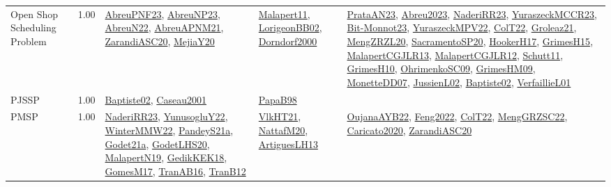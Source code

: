 {\begin{longtable}{p{3cm}r>{\raggedright\arraybackslash}p{6cm}>{\raggedright\arraybackslash}p{6cm}>{\raggedright\arraybackslash}p{8cm}}
\index{Open Shop Scheduling Problem}\index{Classification!Open Shop Scheduling Problem}Open Shop Scheduling Problem &  1.00 & \hyperref[detail:AbreuPNF23]{AbreuPNF23}, \hyperref[detail:AbreuNP23]{AbreuNP23}, \hyperref[detail:AbreuN22]{AbreuN22}, \hyperref[detail:AbreuAPNM21]{AbreuAPNM21}, \hyperref[detail:ZarandiASC20]{ZarandiASC20}, \hyperref[detail:MejiaY20]{MejiaY20} & \hyperref[detail:Malapert11]{Malapert11}, \hyperref[detail:LorigeonBB02]{LorigeonBB02}, \hyperref[detail:Dorndorf2000]{Dorndorf2000} & \hyperref[detail:PrataAN23]{PrataAN23}, \hyperref[detail:Abreu2023]{Abreu2023}, \hyperref[detail:NaderiRR23]{NaderiRR23}, \hyperref[detail:YuraszeckMCCR23]{YuraszeckMCCR23}, \hyperref[detail:Bit-Monnot23]{Bit-Monnot23}, \hyperref[detail:YuraszeckMPV22]{YuraszeckMPV22}, \hyperref[detail:ColT22]{ColT22}, \hyperref[detail:Groleaz21]{Groleaz21}, \hyperref[detail:MengZRZL20]{MengZRZL20}, \hyperref[detail:SacramentoSP20]{SacramentoSP20}, \hyperref[detail:HookerH17]{HookerH17}, \hyperref[detail:GrimesH15]{GrimesH15}, \hyperref[detail:MalapertCGJLR13]{MalapertCGJLR13}, \hyperref[detail:MalapertCGJLR12]{MalapertCGJLR12}, \hyperref[detail:Schutt11]{Schutt11}, \hyperref[detail:GrimesH10]{GrimesH10}, \hyperref[detail:OhrimenkoSC09]{OhrimenkoSC09}, \hyperref[detail:GrimesHM09]{GrimesHM09}, \hyperref[detail:MonetteDD07]{MonetteDD07}, \hyperref[detail:JussienL02]{JussienL02}, \hyperref[detail:Baptiste02]{Baptiste02}, \hyperref[detail:VerfaillieL01]{VerfaillieL01}\\
\index{PJSSP}\index{Classification!PJSSP}PJSSP &  1.00 & \hyperref[detail:Baptiste02]{Baptiste02}, \hyperref[detail:Caseau2001]{Caseau2001} & \hyperref[detail:PapaB98]{PapaB98} & \\
\index{PMSP}\index{Classification!PMSP}PMSP &  1.00 & \hyperref[detail:NaderiRR23]{NaderiRR23}, \hyperref[detail:YunusogluY22]{YunusogluY22}, \hyperref[detail:WinterMMW22]{WinterMMW22}, \hyperref[detail:PandeyS21a]{PandeyS21a}, \hyperref[detail:Godet21a]{Godet21a}, \hyperref[detail:GodetLHS20]{GodetLHS20}, \hyperref[detail:MalapertN19]{MalapertN19}, \hyperref[detail:GedikKEK18]{GedikKEK18}, \hyperref[detail:GomesM17]{GomesM17}, \hyperref[detail:TranAB16]{TranAB16}, \hyperref[detail:TranB12]{TranB12} & \hyperref[detail:VlkHT21]{VlkHT21}, \hyperref[detail:NattafM20]{NattafM20}, \hyperref[detail:ArtiguesLH13]{ArtiguesLH13} & \hyperref[detail:OujanaAYB22]{OujanaAYB22}, \hyperref[detail:Feng2022]{Feng2022}, \hyperref[detail:ColT22]{ColT22}, \hyperref[detail:MengGRZSC22]{MengGRZSC22}, \hyperref[detail:Caricato2020]{Caricato2020}, \hyperref[detail:ZarandiASC20]{ZarandiASC20}\\

\end{longtable}}

